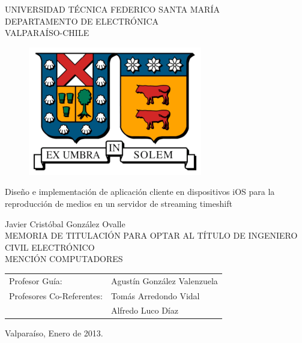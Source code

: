 \begin{titlepage}

\begin{center}

	\large  UNIVERSIDAD TÉCNICA FEDERICO SANTA MARÍA 	\\
 	\large \sc DEPARTAMENTO DE ELECTRÓNICA						\\
 	\large \sc VALPARAÍSO-CHILE												\\
\begin{figure}[h!]
	\centering
 	\includegraphics[scale=1]{imgs/logo_utfsm.eps} 
\end{figure}
\end{center}

\begin{center}
 \LARGE{Diseño e implementación de aplicación cliente en dispositivos iOS para la reproducción de medios en un servidor de streaming timeshift}
\end{center}

\begin{center}
 \normalsize Javier Cristóbal González Ovalle\\
 \normalsize MEMORIA DE TITULACIÓN PARA OPTAR AL TÍTULO DE
 \normalsize INGENIERO CIVIL ELECTRÓNICO			\\
 \normalsize MENCIÓN COMPUTADORES
\end{center}
\vspace*{1.5cm}

\begin{center}
\begin{tabular}{ll}
 \normalsize Profesor Guía: & Agustín González Valenzuela\\
 \normalsize Profesores Co-Referentes: &Tomás Arredondo Vidal\\
 															&Alfredo Luco Díaz
\end{tabular}
\end{center}
 
\vspace*{2cm}
\begin{center}
 \normalsize Valparaíso, Enero de 2013. \\
\end{center}
\end{titlepage}